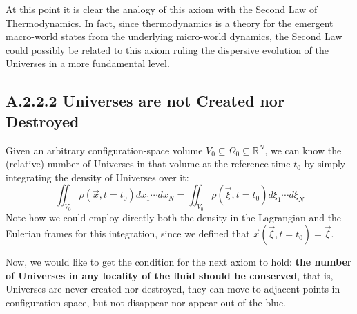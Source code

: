 \documentclass[11pt, a4paper]{article} %
\newcommand{\R}{\mathbb{R}} %
\begin{document}
At this point it is clear the analogy of this axiom with the Second Law of Thermodynamics. In fact, since thermodynamics is a theory for the emergent macro-world states from the underlying micro-world dynamics, the Second Law could possibly be related to this axiom ruling the dispersive evolution of the Universes in a more fundamental level.

\subsection*{A.2.2.2 Universes are not Created nor Destroyed}
Given an arbitrary configuration-space volume $V_0\subseteq\Omega_0\subseteq\R^N$, we can know the (relative) number of Universes in that volume at the reference time $t_0$ by simply integrating the density of Universes over it:
\begin{equation}
\iint_{V_0} \rho(\vec{x},t=t_0) dx_1\cdots dx_N=\iint_{V_0} \rho(\vec{\xi},t=t_0) d\xi_1\cdots d\xi_N
\end{equation}
Note how we could employ directly both the density in the Lagrangian and the Eulerian frames for this integration, since we defined that $\vec{x}(\vec{\xi},t=t_0)=\vec{\xi}$.

Now, we would like to get the condition for the next axiom to hold: {\bf the number of Universes in any locality of the fluid should be conserved}, that is, Universes are never created nor destroyed, they can move to adjacent points in configuration-space, but not disappear nor appear out of the blue.
\end{document}
